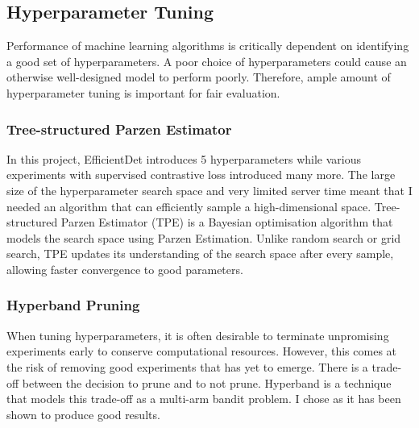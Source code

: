 \documentclass[12pt,a4paper,twoside,openany]{report}
\begin{document}
\subsection{Hyperparameter Tuning}
Performance of machine learning algorithms is critically dependent on identifying a good set of hyperparameters. A poor choice of hyperparameters could cause an otherwise well-designed model to perform poorly. Therefore, ample amount of hyperparameter tuning is important for fair evaluation.

\subsubsection{Tree-structured Parzen Estimator}
In this project, EfficientDet introduces 5 hyperparameters while various experiments with supervised contrastive loss introduced many more. The large size of the hyperparameter search space and very limited server time meant that I needed an algorithm that can efficiently sample a high-dimensional space.
Tree-structured Parzen Estimator (TPE) \cite{bergstra_algorithms_2011} is a Bayesian optimisation algorithm that models the search space using Parzen Estimation. Unlike random search or grid search, TPE updates its understanding of the search space after every sample, allowing faster convergence to good parameters.

\subsubsection{Hyperband Pruning}
When tuning hyperparameters, it is often desirable to terminate unpromising experiments early to conserve computational resources. However, this comes at the risk of removing good experiments that has yet to emerge. There is a trade-off between the decision to prune and to not prune. Hyperband \cite{li_hyperband_2018} is a technique that models this trade-off as a multi-arm bandit problem. I chose as it has been shown to produce good results.
\end{document}
